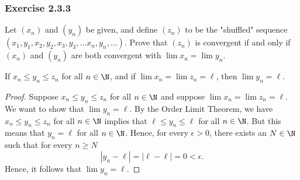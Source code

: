 \subsubsection{Exercise 2.3.3}
Let \( (x_n)  \) and \( (y_n) \) be given, and define \( (z_n) \) to be the "shuffled" sequence \( (x_1, y_1, x_2, y_2, x_3, y_3, \dots x_n, y_n, \dots ). \) Prove that \( (z_n) \) is convergent if and only if \( (x_n) \) and \( (y_n) \) are both convergent with \( \lim x_n = \lim y_n \).
\begin{tcolorbox}
    \begin{thm}
        If \( x_n \leq y_n \leq z_n\) for all \( n \in \N \), and if \( \lim x_n = \lim z_n = \ell\), then \( \lim y_n = \ell\).
    \end{thm}
\end{tcolorbox}
\begin{proof}
    Suppose \( x_n \leq y_n \leq z_n\) for all \( n \in \N \) and suppose \( \lim x_n = \lim z_n = \ell\). We want to show that \( \lim y_n = \ell\). By the Order Limit Theorem, we have \( x_n \leq y_n \leq z_n \) for all \( n \in \N \) implies that \( \ell \leq y_n \leq \ell\) for all \( n \in \N \). But this means that \( y_n = \ell\) for all \( n \in \N \). Hence, for every \( \epsilon  > 0\), there exists an \( N \in \N\) such that for every \( n \geq N\) 
    \[ | y_n - \ell | = | \ell - \ell | = 0 < \epsilon.\]
    Hence, it follows that \( \lim y_n = \ell\).
\end{proof}


